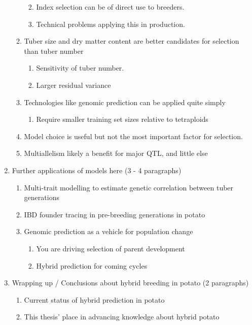 \documentclass[
]{article}
\providecommand{\tightlist}{%
  \setlength{\itemsep}{0pt}\setlength{\parskip}{0pt}}\usepackage{longtable,booktabs,array}
\begin{document}
\begin{enumerate}
\begin{enumerate}
    \begin{enumerate}
    \def\labelenumiii{\Alph{enumiii}.}
    \tightlist
    \item
      Index selection can be of direct use to breeders.
    \item
      Technical problems applying this in production.
    \end{enumerate}
  \item
    Tuber size and dry matter content are better candidates for
    selection than tuber number

    \begin{enumerate}
    \def\labelenumiii{\Alph{enumiii}.}
    \tightlist
    \item
      Sensitivity of tuber number.
    \item
      Larger residual variance
    \end{enumerate}
  \item
    Technologies like genomic prediction can be applied quite simply

    \begin{enumerate}
    \def\labelenumiii{\Alph{enumiii}.}
    \tightlist
    \item
      Require smaller training set sizes relative to tetraploids
    \end{enumerate}
  \item
    Model choice is useful but not the most important factor for
    selection.
  \item
    Multiallelism likely a benefit for major QTL, and little else
  \end{enumerate}
\item
  Further applications of models here (3 - 4 paragraphs)

  \begin{enumerate}
  \def\labelenumii{\roman{enumii})}
  \tightlist
  \item
    Multi-trait modelling to estimate genetic correlation between tuber
    generations
  \item
    IBD founder tracing in pre-breeding generations in potato
  \item
    Genomic prediction as a vehicle for population change

    \begin{enumerate}
    \def\labelenumiii{\Alph{enumiii}.}
    \tightlist
    \item
      You are driving selection of parent development
    \item
      Hybrid prediction for coming cycles
    \end{enumerate}
  \end{enumerate}
\item
  Wrapping up / Conclusions about hybrid breeding in potato (2
  paragraphs)

  \begin{enumerate}
  \def\labelenumii{\roman{enumii})}
  \tightlist
  \item
    Current status of hybrid prediction in potato
  \item
    This thesis' place in advancing knowledge about hybrid potato
  \end{enumerate}
\end{enumerate}


\printbibliography
\end{document}
